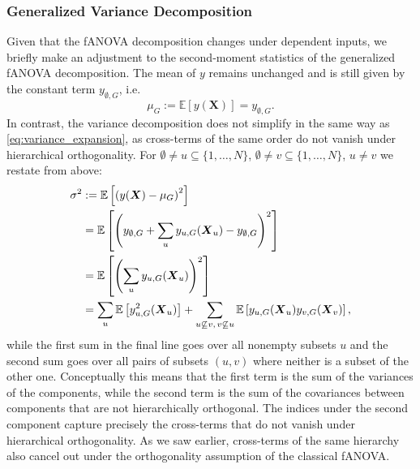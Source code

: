 \subsubsection{Generalized Variance Decomposition}
Given that the fANOVA decomposition changes under dependent inputs, we briefly make an adjustment to the second-moment statistics of the generalized fANOVA decomposition.
The mean of $y$ remains unchanged and is still given by the constant term \( y_{\emptyset,G} \), i.e.
\[
\mu_G := \mathbb{E}[y(\boldsymbol{X})] = y_{\emptyset,G}.
\]
In contrast, the variance decomposition does not simplify in the same way as \autoref{eq:variance_expansion}, as cross-terms of the same order do not vanish under hierarchical orthogonality.
For $ \emptyset \neq u \subseteq \{1,\dots,N\}$, $\emptyset \neq v \subseteq \{1,\dots,N\}$, $u \neq v$ we restate from above:
\begin{align*}
\sigma^2 
&:= \mathbb{E}\left[ \left( y(\boldsymbol{X}) - \mu_G \right)^2 \right] \notag \\
&= \mathbb{E} \left[ \left( y_{\emptyset,G} + \sum_{u} y_{u,G}(\boldsymbol{X}_u) - y_{\emptyset,G} \right)^2 \right] \notag \\
&= \mathbb{E} \left[ \left( \sum_{u} y_{u,G}(\boldsymbol{X}_u) \right)^2 \right] \notag \\
&= \sum_{u} \mathbb{E} \left[ y_{u,G}^2(\boldsymbol{X}_u) \right]
+ \sum_{\substack{u \not\subseteq v,\, v \not\subseteq u}} 
\mathbb{E} \left[ y_{u,G}(\boldsymbol{X}_u) y_{v,G}(\boldsymbol{X}_v) \right],
\end{align*}
while the first sum in the final line goes over all nonempty subsets $u$ and the second sum goes over all pairs of subsets $(u, v)$ where neither is a subset of the other one.
Conceptually this means that the first term is the sum of the variances of the components, while the second term is the sum of the covariances between components that are not hierarchically orthogonal.
The indices under the second component capture precisely the cross-terms that do not vanish under hierarchical orthogonality. As we saw earlier, cross-terms of the same hierarchy also cancel out under the orthogonality assumption of the classical fANOVA.
